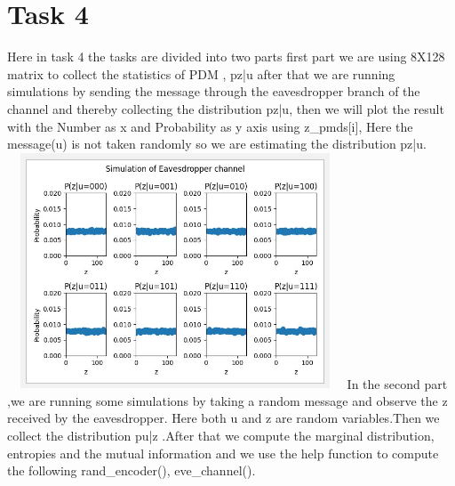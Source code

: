 \documentclass{report}
\begin{document}
\section*{Task 4}
Here in task 4 the tasks are divided into two parts first part we are using 8X128 matrix to collect the statistics of PDM , pz|u after that we are running simulations by sending the message through the eavesdropper branch of the channel and thereby collecting the distribution  pz|u, then we will plot the result with the Number as x and Probability as y axis using z\_pmds[i], Here the message(u) is not taken randomly so we are estimating the distribution pz|u. \hfill \break \linebreak
 \includegraphics[width=10cm,height=7cm]{4}  \hfill \break \linebreak
In the second part ,we are running some simulations  by taking a random message and observe the  z received by the eavesdropper. Here both u and z are random variables.Then we collect the distribution pu|z .After that we compute the marginal distribution, entropies and the mutual information and we use the help function to compute the following rand\_encoder(), eve\_channel().
\end{document}
